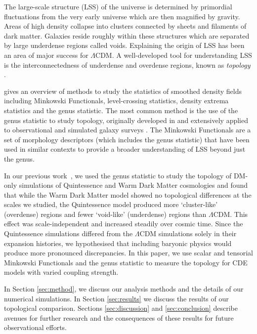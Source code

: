 \documentclass[a4paper,fleqn,usenatbib]{mnras}
\begin{document}
The large-scale structure (LSS) of the universe is determined by primordial fluctuations from the very early universe which are then magnified by gravity. Areas of high density collapse into clusters connected by sheets and filaments of dark matter. Galaxies reside roughly within these structures which are separated by large underdense regions called voids. Explaining the origin of LSS has been an area of major success for $\Lambda$CDM. A well-developed tool for understanding LSS is the interconnectedness of underdense and overdense regions, known as \textit{topology} \citep{1986ApJ...306..341G}.

\citet{2003ApJ...584....1M} gives an overview of methods to study the statistics of smoothed density fields including Minkowski Functionals, level-crossing statistics, density extrema statistics and the genus statistic. The most common method is the use of the genus statistic to study topology, originally developed in \citet{1986ApJ...304...15B} and extensively applied to observational and simulated galaxy surveys \citep{2014ApJ...796...86P,2013ApJS..209...19C,2015ApJ...799..176S,2012ApJ...751...40J}. The Minkowski Functionals are a set of morphology descriptors (which includes the genus statistic) that have been used in similar contexts to provide a broader understanding of LSS beyond just the genus.

In our previous work~\citep{2017MNRAS.468...59W}, we used the genus statistic to study the topology of DM-only simulations of Quintessence and Warm Dark Matter cosmologies and found that while the Warm Dark Matter model showed no topological differences at the scales we studied, the Quintessence model produced more `cluster-like' (overdense) regions and fewer `void-like' (underdense) regions than $\Lambda$CDM. This effect was scale-independent and increased steadily over cosmic time. Since the Quintessence simulations differed from the $\Lambda$CDM simulations solely in their expansion histories, we hypothesised that including baryonic physics would produce more pronounced discrepancies.
In this paper, we use scalar and tensorial Minkowski Functionals and the genus statistic to measure the topology for CDE models with varied coupling strength.

In Section \ref{sec:method}, we discuss our analysis methods and the details of our numerical simulations. In Section \ref{sec:results} we discuss the results of our topological comparison. Sections \ref{sec:discussion} and \ref{sec:conclusion} describe avenues for further research and the consequences of these results for future observational efforts.
\end{document}
